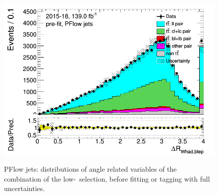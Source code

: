 \begin{figure}[H]
\includegraphics[width=.45\textwidth]{FTAG_plots/pretagNoRwLowpTPFlowall/DataMC_h_dRWhadblep.png} \\
\caption{PFlow jets: distributions of angle related variables of the combination of the low-\pt\ selection,
 before fitting or 
tagging with full uncertainties.} \label{fig:lowpT_angles_PFlow}
\end{figure}


